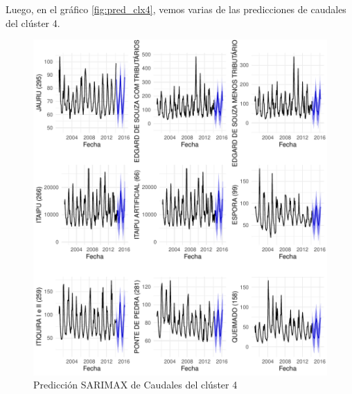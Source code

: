\documentclass[12pt,oneside]{book}\usepackage[]{graphicx}\usepackage[]{color}
\makeatletter
\def\maxwidth{ %
  \ifdim\Gin@nat@width>\linewidth
    \linewidth
  \else
    \Gin@nat@width
  \fi
}
\newenvironment{knitrout}{}{} %
\theoremstyle{definition} %
\makeatother
\begin{document}
Luego, en el gráfico \ref{fig:pred_clx4}, vemos varias de las predicciones de caudales del clúster 4.

\begin{knitrout}
\color{fgcolor}\begin{figure}[h]

{\centering \includegraphics[width=\maxwidth]{figure/unnamed-chunk-118-1} 

}

\caption{\label{fig:pred_clx4} Predicción SARIMAX de Caudales del clúster 4}\label{fig:unnamed-chunk-118}
\end{figure}


\end{knitrout}





\cleardoublepage
% 





\end{document}
